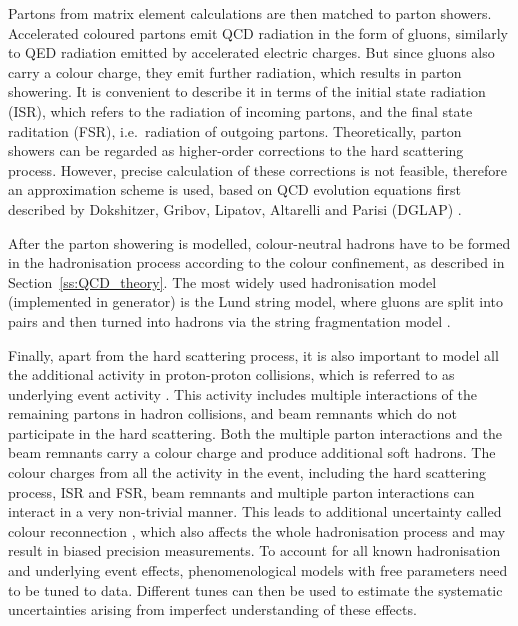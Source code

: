 Partons from matrix element calculations are then matched to parton showers. Accelerated coloured partons emit QCD
radiation in the form of gluons, similarly to QED radiation emitted by accelerated electric charges. But since gluons
also carry a colour charge, they emit further radiation, which results in parton showering. It is convenient to describe
it in terms of the initial state radiation (ISR), which refers to the radiation of incoming partons, and the final state
raditation (FSR), i.e.\ radiation of outgoing partons. Theoretically, parton showers can be regarded as higher-order
corrections to the hard scattering process. However, precise calculation of these corrections is not feasible, therefore
an approximation scheme is used, based on QCD evolution equations first described by Dokshitzer, Gribov, Lipatov,
Altarelli and Parisi (DGLAP) \autocite{Dokshitzer, Gribov_Lipatov, Altarelli_Parisi}.

After the parton showering is modelled, colour-neutral hadrons have to be formed in the hadronisation process according
to the colour confinement, as described in Section~\ref{ss:QCD_theory}. The most widely used hadronisation model
(implemented in \PYTHIA generator) is the Lund string model, where gluons are split into \qqbar pairs and then turned
into hadrons via the string fragmentation model \autocite{Lund_model}.


Finally, apart from the hard scattering process, it is also important to model all the additional activity in
proton-proton collisions, which is referred to as underlying event activity \autocite{underlying_event}. This activity
includes multiple interactions of the remaining partons in hadron collisions, and beam remnants which do not participate
in the hard scattering. Both the multiple parton interactions and the beam remnants carry a colour charge and produce
additional soft hadrons. The colour charges from all the activity in the event, including the hard scattering process,
ISR and FSR, beam remnants and multiple parton interactions can interact in a very non-trivial manner. This leads to
additional uncertainty called colour reconnection \autocite{colour_reconnection}, which also affects the whole
hadronisation process and may result in biased precision measurements. To account for all known hadronisation and
underlying event effects, phenomenological models with free parameters need to be tuned to data. Different tunes can
then be used to estimate the systematic uncertainties arising from imperfect understanding of these effects.

